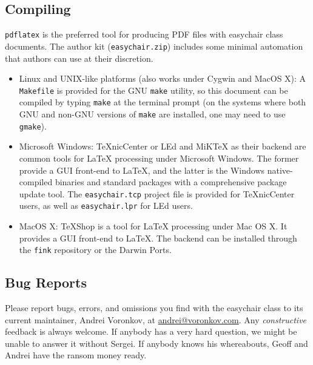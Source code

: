 \documentclass[]{easychair}
\newcommand{\easychair}{\textsf{easychair}}
\newcommand{\miktex}{MiK{\TeX}}
\newcommand{\texniccenter}{{\TeX}nicCenter}
\newcommand{\makefile}{\texttt{Makefile}}
\newcommand{\latexeditor}{LEd}
\begin{document}
\subsection{Compiling}
\label{sect:compiling}

\texttt{pdflatex} \cite{pdflatex-instructions} is the preferred tool for
producing PDF files with {\easychair} class documents.
The author kit (\texttt{easychair.zip}) includes some minimal automation 
that authors can use at their discretion.

\begin{itemize}
\item
Linux and UNIX-like platforms (also works under Cygwin and MacOS X):
A {\makefile} is provided for the GNU \texttt{make} \cite{gmake} utility,
so this document can be compiled by typing \texttt{make} at the terminal 
prompt (on the systems where both GNU and non-GNU versions of \texttt{make} 
are installed, one may need to use \texttt{gmake}).

\item
Microsoft Windows:
{\texniccenter} \cite{texniccenter} or {\latexeditor} \cite{led} and
{\miktex} \cite{miktex} as their backend are common tools
for {\LaTeX} processing under Microsoft Windows. 
The former provide a GUI front-end to {\LaTeX}, and the latter is the 
Windows native-compiled binaries and standard packages with 
a comprehensive package update tool. 
The \texttt{easychair.tcp} project file is provided for {\texniccenter} users,
as well as \texttt{easychair.lpr} for {\latexeditor} users.

\item
MacOS X:
TeXShop \cite{texshop} is a tool for {\LaTeX} processing under Mac OS X.
It provides a GUI front-end to {\LaTeX}. The backend can be installed
through the \texttt{fink} \cite{fink} repository or the Darwin Ports.

\end{itemize}

\subsection{Bug Reports}
\label{sec:bug-reports}

Please report bugs, errors, and omissions you find with the {\easychair} 
class to its current maintainer, Andrei Voronkov,
at \url{andrei@voronkov.com}. Any \emph{constructive} feedback is
always welcome. If anybody has a very hard question, we might be
unable to answer it without Sergei. If anybody knows his whereabouts,
Geoff and Andrei have the ransom money ready.
\end{document}
